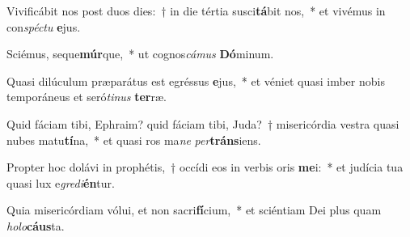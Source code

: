\item Vivificábit nos post duos dies:~† in die tértia susci\textbf{tá}bit nos,~* et vivémus in con\textit{spéc}\textit{tu} \textbf{e}jus.
\item Sciémus, seque\textbf{múr}que,~* ut cognos\textit{cá}\textit{mus} \textbf{Dó}minum.
\item Quasi dilúculum præparátus est egréssus \textbf{e}jus,~* et véniet quasi imber nobis temporáneus et seró\textit{ti}\textit{nus} \textbf{ter}ræ.
\item Quid fáciam tibi, Ephraim? quid fáciam tibi, Juda?~† misericórdia vestra quasi nubes matu\textbf{tí}na,~* et quasi ros ma\textit{ne} \textit{per}\textbf{tráns}iens.
\item Propter hoc dolávi in prophétis,~† occídi eos in verbis oris \textbf{me}i:~* et judícia tua quasi lux e\textit{gre}\textit{di}\textbf{én}tur.
\item Quia misericórdiam vólui, et non sacri\textbf{fí}cium,~* et sciéntiam Dei plus quam \textit{ho}\textit{lo}\textbf{cáus}ta.
